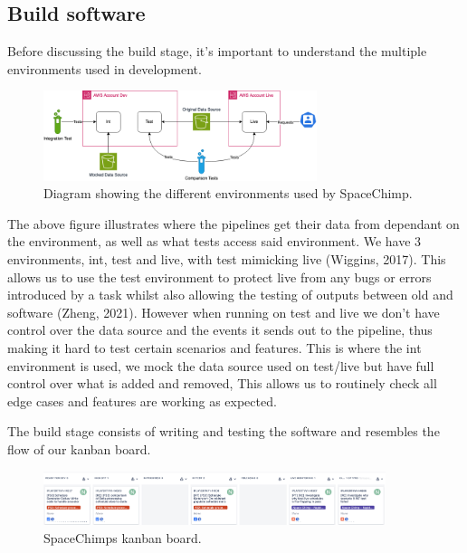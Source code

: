 \subsection{Build software}
  Before discussing the build stage, it's important to understand the multiple environments used in development.

  \begin{figure}[H]
    \centering
    \includegraphics[width=8cm]{assets/environments.drawio.png}
    \caption{Diagram showing the different environments used by SpaceChimp.}
    \label{fig:environments}
  \end{figure}

  The above figure illustrates where the pipelines get their data from dependant on the environment, as well as what tests access said environment.
  We have 3 environments, int, test and live, with test mimicking live (Wiggins, 2017). This allows us to use the test environment to protect live from 
  any bugs or errors introduced by a task whilst also allowing the testing of outputs between old and software (Zheng, 2021). However when running on test
  and live we don't have control over the data source and the events it sends out to the pipeline, thus making it hard to test certain scenarios and features.
  This is where the int environment is used, we mock the data source used on test/live but have full control over what is added and removed, This allows 
  us to routinely check all edge cases and features are working as expected.

  \vspace{0.2cm}

  The build stage consists of writing and testing the software and resembles the flow of our kanban board.

  \begin{figure}[H]
    \centering
    \includegraphics[width=10cm]{assets/kanbanBoard.png}
    \caption{SpaceChimps kanban board.}
    \label{fig:kanbanBoard2}
  \end{figure}

